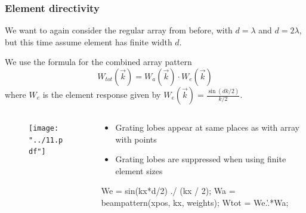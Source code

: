 \documentclass[compress]{beamer}
\begin{document}
\begin{frame}[fragile] %
    \frametitle{Element directivity}
    We want to again consider the regular array from before, with $d=\lambda$ and
    $d=2\lambda$, but this time assume element has finite width $d$.

    We use the formula for the combined array pattern
    \begin{equation*}
        W_{tot}\left(\vec{k}\right) = W_a\left(\vec{k}\right)\cdot W_e\left(\vec{k}\right)
    \end{equation*}
    where $W_e$ is the element response given by
    $W_e\left(\vec{k}\right) = \frac{\sin\left(dk/2\right)}{k/2}$.
    \begin{columns}
        \begin{column}{0.5\textwidth}
            \begin{figure}
                \texttt{[image: "../11.pdf"]}
            \end{figure}
        \end{column}
        \begin{column}{0.5\textwidth}
            \begin{itemize}
                \item Grating lobes appear at same places as with array with points
                \item Grating lobes are suppressed when using finite element sizes
            \end{itemize}
            \begin{jllisting}[gobble=16,language=Matlab]
                We = sin(kx*d/2) ./ (kx / 2);
                Wa = beampattern(xpos, kx, weights);
                Wtot = We.'.*Wa;
            \end{jllisting}
        \end{column}
    \end{columns}
\end{frame}
\end{document}
